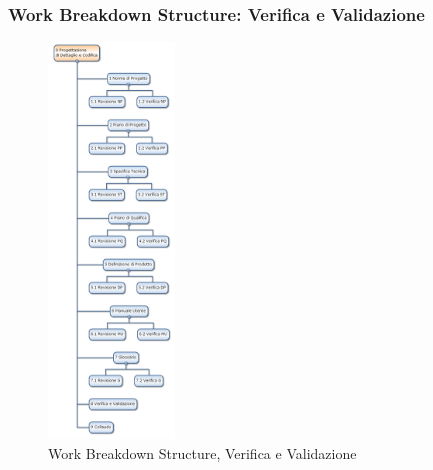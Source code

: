 \newpage
\subsubsection{Work Breakdown Structure: Verifica e Validazione}
\begin{figure}[h]
	\centering
	\includegraphics[width=0.3\textwidth]{./img/wbs_verifica.png}
	\caption{Work Breakdown Structure, Verifica e Validazione}
\end{figure}
